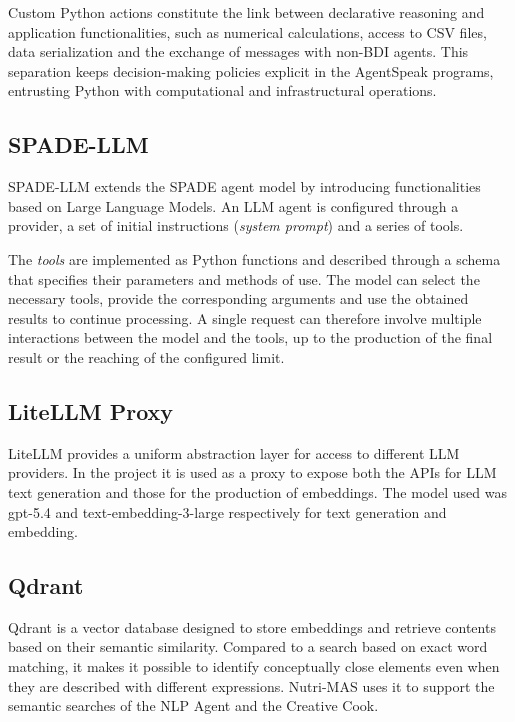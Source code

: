\documentclass[12pt,a4paper]{article}
\begin{document}
Custom Python actions constitute the link between
declarative reasoning and application functionalities, such as numerical
calculations, access to CSV files, data serialization and the exchange of
messages with non-BDI agents. This separation keeps decision-making
policies explicit in the AgentSpeak programs, entrusting Python with computational
and infrastructural operations.

\subsection{SPADE-LLM}

SPADE-LLM extends the SPADE agent model by introducing functionalities
based on Large Language Models. An LLM agent is configured through a
provider, a set of initial instructions (\emph{system prompt}) and a series
of tools.

The \emph{tools} are implemented as Python functions and described through a
schema that specifies their parameters and methods of use. The model can
select the necessary tools, provide the corresponding arguments and use
the obtained results to continue processing. A single request can
therefore involve multiple interactions between the model and the tools, up to the production
of the final result or the reaching of the configured limit.

\subsection{LiteLLM Proxy}

LiteLLM provides a uniform abstraction layer for access to different
LLM providers. In the project it is used as a proxy to expose both the APIs for
LLM text generation and those for the production of embeddings.
The model used was gpt-5.4 and text-embedding-3-large respectively for text generation and embedding.

\subsection{Qdrant}

Qdrant is a vector database designed to store embeddings and
retrieve contents based on their semantic similarity. Compared to a
search based on exact word matching, it makes it possible to identify
conceptually close elements even when they are described with
different expressions. Nutri-MAS uses it to support the semantic searches of the NLP
Agent and the Creative Cook.
\end{document}
